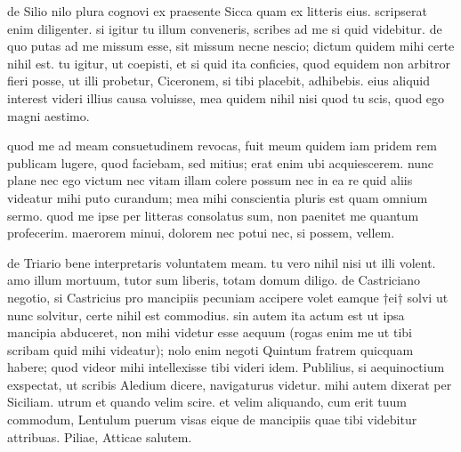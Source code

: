 


 de Silio nilo plura cognovi ex praesente Sicca quam ex litteris eius. scripserat enim diligenter. si igitur tu illum conveneris, scribes ad me si quid videbitur. de quo putas ad me missum esse, sit missum necne nescio; dictum quidem mihi certe nihil est. tu igitur, ut coepisti, et si quid ita conficies, quod equidem non arbitror fieri posse, ut illi probetur, Ciceronem, si tibi placebit, adhibebis. eius aliquid interest videri illius causa voluisse, mea quidem nihil nisi quod tu scis, quod ego magni aestimo.

 quod me ad meam consuetudinem revocas, fuit meum quidem iam pridem rem publicam lugere, quod faciebam, sed mitius; erat enim ubi acquiescerem. nunc plane nec ego victum nec vitam illam colere possum nec in ea re quid aliis videatur mihi puto curandum; mea mihi conscientia pluris est quam omnium sermo. quod me ipse per litteras consolatus sum, non paenitet me quantum profecerim. maerorem minui, dolorem nec potui nec, si possem, vellem.

 de Triario bene interpretaris voluntatem meam. tu vero nihil nisi ut illi volent. amo illum mortuum, tutor sum liberis, totam domum diligo. de Castriciano negotio, si Castricius pro mancipiis pecuniam accipere volet eamque †ei† solvi ut nunc solvitur, certe nihil est commodius. sin autem ita actum est ut ipsa mancipia abduceret, non mihi videtur esse aequum (rogas enim me ut tibi scribam quid mihi videatur); nolo enim negoti Quintum fratrem quicquam habere; quod videor mihi intellexisse tibi videri idem. Publilius, si aequinoctium exspectat, ut scribis Aledium dicere, navigaturus videtur. mihi autem dixerat per Siciliam. utrum et quando velim scire. et velim aliquando, cum erit tuum commodum, Lentulum puerum visas eique de mancipiis quae tibi videbitur attribuas. Piliae, Atticae salutem.
